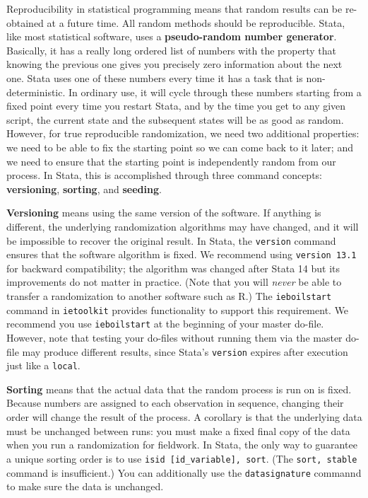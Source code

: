 Reproducibility in statistical programming means that random results
can be re-obtained at a future time.
All random methods should be reproducible.\cite{orozco2018make}
Stata, like most statistical software, uses a \textbf{pseudo-random number generator}.
Basically, it has a really long ordered list of numbers with the property that
knowing the previous one gives you precisely zero information about the next one.
Stata uses one of these numbers every time it has a task that is non-deterministic.
In ordinary use, it will cycle through these numbers starting from a fixed point
every time you restart Stata, and by the time you get to any given script,
the current state and the subsequent states will be as good as random.
However, for true reproducible randomization, we need two additional properties:
we need to be able to fix the starting point so we can come back to it later;
and we need to ensure that the starting point is independently random from our process.
In Stata, this is accomplished through three command concepts:
\textbf{versioning}, \textbf{sorting}, and \textbf{seeding}.

\textbf{Versioning} means using the same version of the software.
If anything is different, the underlying randomization algorithms may have changed,
and it will be impossible to recover the original result.
In Stata, the \texttt{version} command ensures that the software algorithm is fixed.
We recommend using \texttt{version 13.1} for backward compatibility;
the algorithm was changed after Stata 14 but its improvements do not matter in practice.
(Note that you will \textit{never} be able to transfer a randomization to another software such as R.)
The \texttt{ieboilstart} command in \texttt{ietoolkit} provides functionality to support this requirement.
We recommend you use \texttt{ieboilstart} at the beginning of your master do-file.
However, note that testing your do-files without running them
via the master do-file may produce different results,
since Stata's \texttt{version} expires after execution just like a \texttt{local}.

\textbf{Sorting} means that the actual data that the random process is run on is fixed.
Because numbers are assigned to each observation in sequence,
changing their order will change the result of the process.
A corollary is that the underlying data must be unchanged between runs:
you must make a fixed final copy of the data when you run a randomization for fieldwork.
In Stata, the only way to guarantee a unique sorting order is to use
\texttt{isid [id\_variable], sort}. (The \texttt{sort, stable} command is insufficient.)
You can additionally use the \texttt{datasignature} commannd to make sure the data is unchanged.

